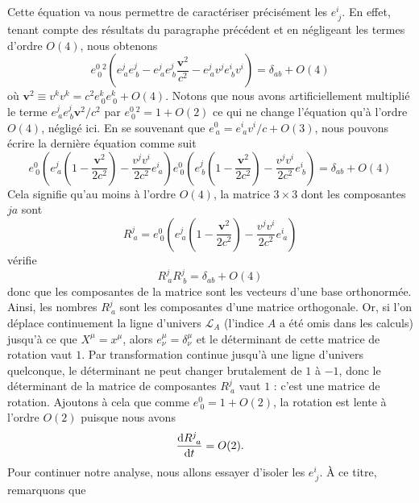 			Cette équation va nous permettre de caractériser précisément les $e^i_{\ j}$. En effet, tenant compte des résultats du paragraphe précédent et en négligeant les termes d'ordre $O(4)$, nous obtenons
			\begin{equation}
				e^0_{\ 0}^2\left( e^j_{\ a}e^j_{\ b} - e^j_{\ a}e^j_{\ b}\frac{\bm{v}^2}{c^2}-e^j_{\ a}v^j e^i_{\ b}v^i \right) = \delta_{ab}+O(4)
			\end{equation}
			où $\bm{v}^2\equiv v^kv^k=c^2e^k_{\ 0}e^k_{\ 0} + O(4)$. Notons que nous avons artificiellement multiplié le terme $e^j_{\ a}e^j_{\ b}\bm{v}^2/c^2$ par $e^0_{\ 0}^2=1+O(2)$ ce qui ne change l'équation qu'à l'ordre $O(4)$, négligé ici. En se souvenant que $e^0_{\ a}=e^i_{\ a}v^i/c+O(3)$, nous pouvons écrire la dernière équation comme suit 
			\begin{equation}
				e^0_{\ 0} \left( e^j_{\ a} \left( 1-\frac{\bm{v}^2}{2c^2} \right) - \frac{v^j v^i}{2c^2} e^i_{\ a} \right)
				e^0_{\ 0} \left( e^j_{\ b} \left( 1-\frac{\bm{v}^2}{2c^2} \right) - \frac{v^j v^i}{2c^2} e^i_{\ b} \right)
				= \delta_{ab}+O(4)
			\end{equation}
			Cela signifie qu'au moins à l'ordre $O(4)$, la matrice $3\times 3$ dont les composantes $ja$ sont
			\begin{equation}
				R^j_{\ a}=e^0_{\ 0} \left( e^j_{\ a} \left( 1-\frac{\bm{v}^2}{2c^2} \right) - \frac{v^j v^i}{2c^2} e^i_{\ a} \right)
			\end{equation}
			vérifie
			\begin{equation}
				R^j_{\ a}R^j_{\ b}=\delta_{ab}+O(4)
			\end{equation}
			donc que les composantes de la matrice sont les vecteurs d'une base orthonormée. Ainsi, les nombres $R^j_{\ a}$ sont les composantes d'une matrice orthogonale. Or, si l'on déplace continuement la ligne d'univers $\mathscr{L}_A$ (l'indice $A$ a été omis dans les calculs) jusqu'à ce que $X^\mu=x^\mu$, alors $e^\mu_{\nu}=\delta^\mu_{\nu}$ et le déterminant de cette matrice de rotation vaut $1$. Par transformation continue jusqu'à une ligne d'univers quelconque, le déterminant ne peut changer brutalement de $1$ à $-1$, donc le déterminant de la matrice de composantes $R^j_{\ a}$ vaut $1$ : c'est une matrice de rotation. Ajoutons à cela que comme $e^0_{\ 0}=1+O(2)$, la rotation est lente à l'ordre $O(2)$ puisque nous avons
			\begin{equation}
			 	\frac{\mathrm{d} R^j_{\ a}}{\mathrm{d} t}=O(2).
			\end{equation} 
			Pour continuer notre analyse, nous allons essayer d'isoler les $e^i_{\ j}$. À ce titre, remarquons que
